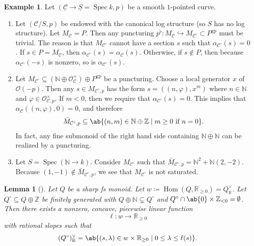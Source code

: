 \documentclass{amsart}
\newtheorem{lem}[thm]{Lemma}
\theoremstyle{definition}
\newtheorem{exm}[thm]{Example}
\theoremstyle{remark}
\theoremstyle{plain}
\theoremstyle{definition}
\theoremstyle{remark}
\newcommand{\N}{\mathbb{N}}
\newcommand{\R}{\mathbb{R}}
\newcommand{\Z}{\mathbb{Z}}
\newcommand{\mc}[1]{\mathcal{#1}}
\newcommand{\on}[1]{\operatorname{#1}}
\newcommand{\ul}[1]{\underline{#1}}
\newcommand{\1}{\mathbf{1}}
\newcommand{\2}{\mathbf{2}}
\newcommand{\3}{\mathbf{3}}
\DeclareMathOperator{\Hom}{Hom}
\DeclareMathOperator{\Spec}{Spec}
\begin{document}
\begin{exm}
    Let \((\ul{\mc{C}} \to \ul{S} = \Spec k, p)\) be a smooth \(1\)-pointed curve.
    \begin{enumerate}
        \item Let \((\mc{C}/S, p)\) be endowed with the canonical log structure (so \(S\) has no log structure). Let \(M_{\mc{C}} = P\). Then any puncturing \(p^{\flat} \colon M_{\mc{C}} \hookrightarrow M_{\mc{C}^{\circ}} \subset P^{\on{gp}}\) must be trivial. The reason is that \(M_{\mc{C}^{\circ}}\) cannot have a section \(s\) such that \(\alpha_{\mc{C}^{\circ}}(s) = 0\). If \(s \in P = M_{\mc{C}}\), then \(\alpha_{\mc{C}^{\circ}}(s) = \alpha_{\mc{C}}(s)\). Otherwise, if \(s \notin P\), then because \(\alpha_{\mc{C}^{\circ}}(-s)\) is nonzero, so is \(\alpha_{\mc{C}^{\circ}}(s)\).
        \item Let \(M_{\mc{C}^{\circ}} \subseteq (\N \oplus \mc{O}_{\mc{C}}^{\times}) \oplus P^{\on{gp}}\) be a puncturing. Choose a local generator \(x\)  of \(\mc{O}(-p)\). Then any \(s \in M_{\mc{C}^{\circ}, p}\) has the form \(s = ((n, \varphi), x^m)\) where \(n \in \N\) and \(\varphi \in \mc{O}_{\mc{C}, p}^{\times}\). If \(m < 0\), then we require that \(\alpha_{\mc{C}^{\circ}}(s) = 0\). This implies that \(\alpha_{\mc{C}}((n, \varphi), 0) = 0\), and therefore
            \[ \bar{M}_{\mc{C}^{\circ}, p} \subseteq \ab\{(n, m) \in \N \oplus \Z \mid m \geq 0 \text{ if } n = 0 \}. \]
            In fact, any fine submonoid of the right hand side containing \(\N \oplus \N\) can be realized by a puncturing.
        \item Let \(S = \Spec(\N \to k)\). Consider \(M_{\mc{C}^{\circ}}\) such that \(\bar{M}_{\mc{C}^{\circ}, p} = \N^2 + \N (2,-2)\). Because \((1,-1) \notin \bar{M}_{\mc{C}^{\circ}, p}\), we see that \(M_{\mc{C}^{\circ}}\) is not saturated.
    \end{enumerate}
\end{exm}

\begin{lem}[{\cite{ACGS2025}}]
    Let \(Q\) be a sharp fs monoid. Let \(w \coloneqq \Hom(Q, \R_{\geq 0}) = Q_{\R}^{\vee}\). Let \(Q^{\circ} \subseteq Q \oplus \Z\) be finitely generated with \(Q \oplus \N \subsetneq Q^{\circ}\) and \(Q^{\circ} \cap \ab\{0\} \times \Z_{<0} = \emptyset\). Then there exists a nonzero, concave, piecewise linear function
    \[ \ell \colon w \to \R_{\geq 0} \]
    with rational slopes such that
    \[ (Q^{\circ})_{\R}^{\vee} = \ab\{ (s, \lambda) \in w \times \R_{\geq 0} \mid 0 \leq \lambda \leq \ell(s) \}. \]
\end{lem}
\end{document}
